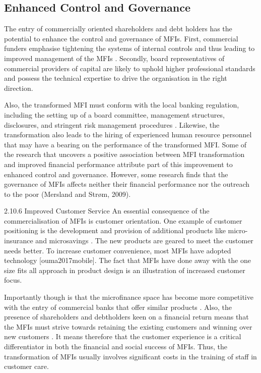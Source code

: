 \documentclass[a4paper,nobind]{templates/ociamthesis}
\begin{document}
\hypertarget{enhanced-control-and-governance}{%
\subsection{Enhanced Control and Governance}\label{enhanced-control-and-governance}}

\noindent The entry of commercially oriented shareholders and debt holders has the potential to enhance the control and governance of MFIs. First, commercial funders emphasise tightening the systems of internal controls and thus leading to improved management of the MFIs \autocite{mersland2009cost,mersland2010microfinance}. Secondly, board representatives of commercial providers of capital are likely to uphold higher professional standards and possess the technical expertise to drive the organisation in the right direction.

Also, the transformed MFI must conform with the local banking regulation, including the setting up of a board committee, management structures, disclosures, and stringent risk management procedures \autocite{frank2008stemming}. Likewise, the transformation also leads to the hiring of experienced human resource personnel that may have a bearing on the performance of the transformed MFI. Some of the research that uncovers a positive association between MFI transformation and improved financial performance attribute part of this improvement to enhanced control and governance. However, some research finds that the governance of MFIs affects neither their financial performance nor the outreach to the poor \autocite{mersland2009cost} (Mersland and Strøm, 2009).

2.10.6 Improved Customer Service
\noindent An essential consequence of the commercialisation of MFIs is customer orientation. One example of customer positioning is the development and provision of additional products like micro-insurance and microsavings \autocite{chandrasekhar2015microsavings}. The new products are geared to meet the customer needs better. To increase customer convenience, most MFIs have adopted technology {[}ouma2017mobile{]}. The fact that MFIs have done away with the one size fits all approach in product design is an illustration of increased customer focus.

Importantly though is that the microfinance space has become more competitive with the entry of commercial banks that offer similar products \autocite{kar2016measuring}. Also, the presence of shareholders and debtholders keen on a financial return means that the MFIs must strive towards retaining the existing customers and winning over new customers \autocite{ballwieser2012agency}. It means therefore that the customer experience is a critical differentiator in both the financial and social success of MFIs. Thus, the transformation of MFIs usually involves significant costs in the training of staff in customer care.
\end{document}
